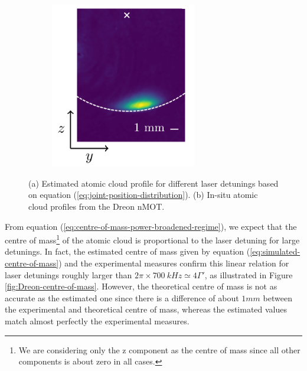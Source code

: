 \begin{figure}[!ht]
\begin{subfigure}[b]{0.4\linewidth}
        \includegraphics[width=0.7\textwidth]{USPSC-img/in-situ-atomic-cloud-Dreon.png}
        \vspace{30px}
        \label{fig:Dreon-in-situ-atomic-cloud-profile}
    \end{subfigure}
    \caption{(a) Estimated atomic cloud profile for different laser detunings based on equation (\ref{eq:joint-position-distribution}). (b) In-situ atomic cloud profiles from the Dreon nMOT.}
\end{figure}

From equation (\ref{eq:centre-of-mass-power-broadened-regime}), we expect that the centre of mass\footnote{We are considering only the z component as the centre of mass since all other components is about zero in all cases.} of the atomic cloud is proportional to the laser detuning for large detunings. In fact, the estimated centre of mass given by equation (\ref{eq:simulated-centre-of-mass}) and the experimental measures confirm this linear relation for laser detunings roughly larger than $ 2\pi \times 700\ kHz \simeq 4\Gamma' $, as illustrated in Figure \ref{fig:Dreon-centre-of-mass}. However, the theoretical centre of mass is not as accurate as the estimated one since there is a difference of about $1mm$ between the experimental and theoretical centre of mass, whereas the estimated values match almost perfectly the experimental measures.

